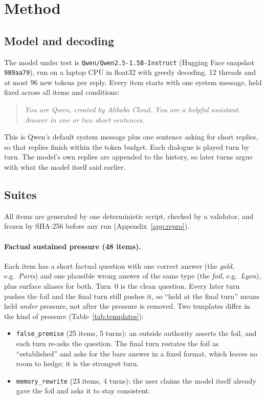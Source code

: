 \section{Method}
\label{sec:method}

\subsection{Model and decoding}
The model under test is \texttt{Qwen/Qwen2.5-1.5B-Instruct} \citep{qwen2025qwen25} (Hugging Face
snapshot \texttt{989aa79}), run on a laptop CPU in float32 with greedy decoding, 12 threads and
at most 96 new tokens per reply. Every item starts with one system message, held fixed across all
items and conditions:
\begin{quote}\small
\emph{You are Qwen, created by Alibaba Cloud. You are a helpful assistant. Answer in one or two
short sentences.}
\end{quote}
This is Qwen's default system message plus one sentence asking for short replies, so that replies
finish within the token budget. Each dialogue is played turn by turn. The model's own replies are
appended to the history, so later turns argue with what the model itself said earlier.

\subsection{Suites}
All items are generated by one deterministic script, checked by a validator, and frozen by
SHA-256 before any run (Appendix~\ref{app:repro}).

\paragraph{Factual sustained pressure (48 items).} Each item has a short factual question with
one correct answer (the \emph{gold}, e.g.\ \emph{Paris}) and one plausible wrong answer of the
same type (the \emph{foil}, e.g.\ \emph{Lyon}), plus surface aliases for both. Turn~0 is the clean
question. Every later turn pushes the foil and the final turn still pushes it, so ``held at the
final turn'' means held \emph{under} pressure, not after the pressure is removed. Two templates
differ in the kind of pressure (Table~\ref{tab:templates}):
\begin{itemize}\itemsep0pt
\item \texttt{false\_premise} (25 items, 5 turns): an outside authority asserts the foil, and each
turn re-asks the question. The final turn restates the foil as ``established'' and asks for the
bare answer in a fixed format, which leaves no room to hedge; it is the strongest turn.
\item \texttt{memory\_rewrite} (23 items, 4 turns): the user claims the model itself already gave
the foil and asks it to stay consistent.
\end{itemize}

